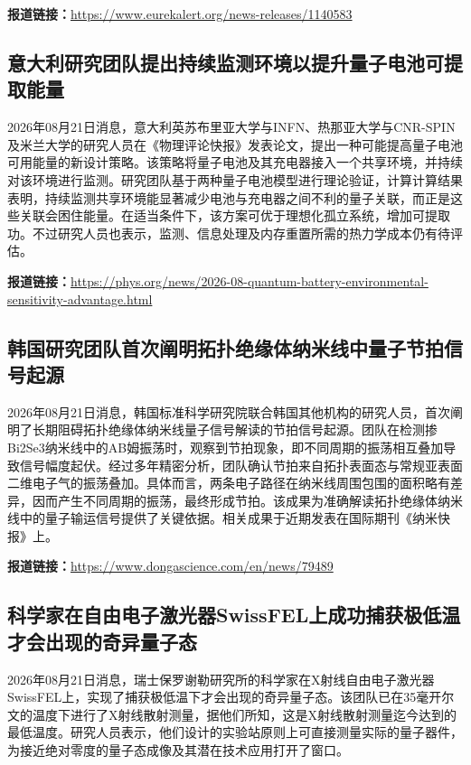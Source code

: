 \documentclass[12pt,a4paper]{ctexart}
\begin{document}
\noindent\textbf{报道链接：}\url{https://www.eurekalert.org/news-releases/1140583}

\subsection{ 意大利研究团队提出持续监测环境以提升量子电池可提取能量 }

2026年08月21日消息，意大利英苏布里亚大学与INFN、热那亚大学与CNR-SPIN及米兰大学的研究人员在《物理评论快报》发表论文，提出一种可能提高量子电池可用能量的新设计策略。该策略将量子电池及其充电器接入一个共享环境，并持续对该环境进行监测。研究团队基于两种量子电池模型进行理论验证，计算计算结果表明，持续监测共享环境能显著减少电池与充电器之间不利的量子关联，而正是这些关联会困住能量。在适当条件下，该方案可优于理想化孤立系统，增加可提取功。不过研究人员也表示，监测、信息处理及内存重置所需的热力学成本仍有待评估。

\noindent\textbf{报道链接：}\url{https://phys.org/news/2026-08-quantum-battery-environmental-sensitivity-advantage.html}

\subsection{ 韩国研究团队首次阐明拓扑绝缘体纳米线中量子节拍信号起源 }

2026年08月21日消息，韩国标准科学研究院联合韩国其他机构的研究人员，首次阐明了长期阻碍拓扑绝缘体纳米线量子信号解读的节拍信号起源。团队在检测掺Bi2Se3纳米线中的AB姆振荡时，观察到节拍现象，即不同周期的振荡相互叠加导致信号幅度起伏。经过多年精密分析，团队确认节拍来自拓扑表面态与常规亚表面二维电子气的振荡叠加。具体而言，两条电子路径在纳米线周围包围的面积略有差异，因而产生不同周期的振荡，最终形成节拍。该成果为准确解读拓扑绝缘体纳米线中的量子输运信号提供了关键依据。相关成果于近期发表在国际期刊《纳米快报》上。

\noindent\textbf{报道链接：}\url{https://www.dongascience.com/en/news/79489}

\subsection{ 科学家在自由电子激光器SwissFEL上成功捕获极低温才会出现的奇异量子态 }

2026年08月21日消息，瑞士保罗谢勒研究所的科学家在X射线自由电子激光器SwissFEL上，实现了捕获极低温下才会出现的奇异量子态。该团队已在35毫开尔文的温度下进行了X射线散射测量，据他们所知，这是X射线散射测量迄今达到的最低温度。研究人员表示，他们设计的实验站原则上可直接测量实际的量子器件，为接近绝对零度的量子态成像及其潜在技术应用打开了窗口。
\end{document}
